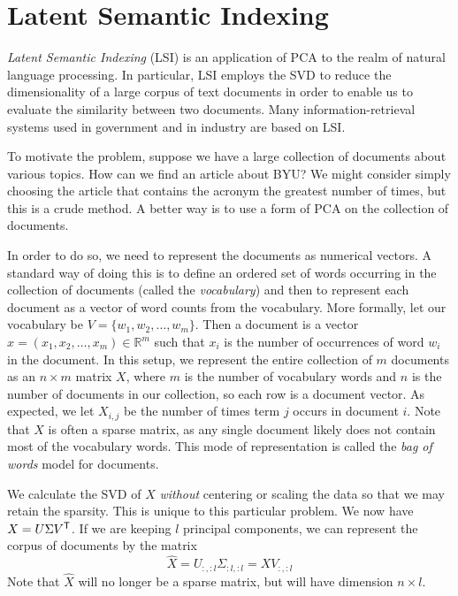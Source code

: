 \section*{Latent Semantic Indexing} %

\emph{Latent Semantic Indexing} (LSI) is an application of PCA to the realm of natural language processing.
In particular, LSI employs the SVD to reduce the dimensionality of a large corpus of text documents in order to enable us to evaluate the similarity between two documents.
Many information-retrieval systems used in government and in industry are based on LSI.

To motivate the problem, suppose we have a large collection of documents about various topics.
How can we find an article about BYU? %
We might consider simply choosing the article that contains the acronym the greatest number of times, but this is a crude method.
A better way is to use a form of PCA on the collection of documents.

In order to do so, we need to represent the documents as numerical vectors.
A standard way of doing this is to define an ordered set of words occurring in the collection of documents (called the \emph{vocabulary}) and then to represent each document as a vector of word counts from the vocabulary.
More formally, let our vocabulary be $V = \{w_1,w_2,\ldots,w_m\}$.
Then a document is a vector $x  = (x_1,x_2,\ldots,x_m) \in \mathbb{R}^m$ such that $x_i$ is the number of occurrences of word $w_i$ in the document.
In this setup, we represent the entire collection of $m$ documents as an $n \times m$ matrix $X$, where $m$ is the number of vocabulary words and $n$ is the number of documents in our collection, so each row is a document vector.
As expected, we let $X_{i,j}$ be the number of times term $j$ occurs in document $i$.
Note that $X$ is often a sparse matrix, as any single document likely does not contain most of the vocabulary words.
This mode of representation is called the \emph{bag of words} model for documents.

We calculate the SVD of $X$ \emph{without} centering or scaling the data so that we may retain the sparsity. 
This is unique to this particular problem.
We now have $X = U\Sigma V^{\mathsf T} $.
If we are keeping $l$ principal components, we can represent the corpus of documents by the matrix
\[
\widehat{X} = U_{:,:l}\Sigma_{:l,:l} = XV_{:,:l}
\]
Note that $\widehat{X}$ will no longer be a sparse matrix, but will have dimension $n \times l$.

